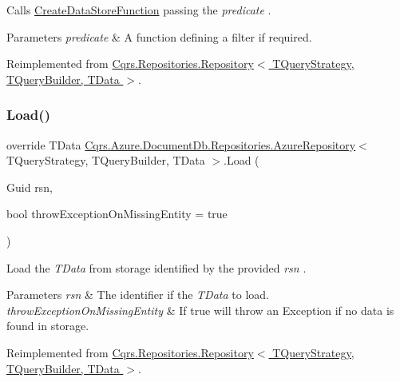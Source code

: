Calls \hyperlink{classCqrs_1_1Repositories_1_1Repository_ae15cee6394a223564ad2ead65cd30189_ae15cee6394a223564ad2ead65cd30189}{Create\+Data\+Store\+Function} passing the {\itshape predicate} . 


\begin{DoxyParams}{Parameters}
{\em predicate} & A function defining a filter if required.\\
\hline
\end{DoxyParams}


Reimplemented from \hyperlink{classCqrs_1_1Repositories_1_1Repository_ab95fc66b24e8359a1e2f48a3ca2f14c1_ab95fc66b24e8359a1e2f48a3ca2f14c1}{Cqrs.\+Repositories.\+Repository$<$ T\+Query\+Strategy, T\+Query\+Builder, T\+Data $>$}.

\mbox{\label{classCqrs_1_1Azure_1_1DocumentDb_1_1Repositories_1_1AzureRepository_a22c58163e101a6cb80f891bed6114380_a22c58163e101a6cb80f891bed6114380}} 
\subsubsection{\texorpdfstring{Load()}{Load()}}
{\footnotesize\ttfamily override T\+Data \hyperlink{classCqrs_1_1Azure_1_1DocumentDb_1_1Repositories_1_1AzureRepository}{Cqrs.\+Azure.\+Document\+Db.\+Repositories.\+Azure\+Repository}$<$ T\+Query\+Strategy, T\+Query\+Builder, T\+Data $>$.Load (\begin{DoxyParamCaption}\item[{Guid}]{rsn,  }\item[{bool}]{throw\+Exception\+On\+Missing\+Entity = {\ttfamily true} }\end{DoxyParamCaption})\hspace{0.3cm}{\ttfamily [virtual]}}



Load the {\itshape T\+Data}  from storage identified by the provided {\itshape rsn} . 


\begin{DoxyParams}{Parameters}
{\em rsn} & The identifier if the {\itshape T\+Data}  to load.\\
\hline
{\em throw\+Exception\+On\+Missing\+Entity} & If true will throw an Exception if no data is found in storage.\\
\hline
\end{DoxyParams}


Reimplemented from \hyperlink{classCqrs_1_1Repositories_1_1Repository_a444e9dfe4710be90940dbb6dec9d856f_a444e9dfe4710be90940dbb6dec9d856f}{Cqrs.\+Repositories.\+Repository$<$ T\+Query\+Strategy, T\+Query\+Builder, T\+Data $>$}.

